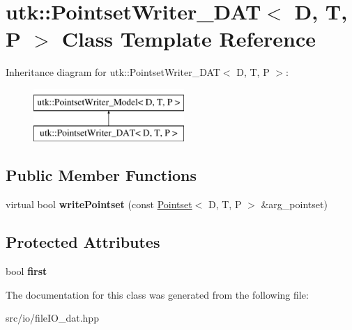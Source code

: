 \hypertarget{classutk_1_1PointsetWriter__DAT}{\section{utk\-:\-:Pointset\-Writer\-\_\-\-D\-A\-T$<$ D, T, P $>$ Class Template Reference}
\label{classutk_1_1PointsetWriter__DAT}
}
Inheritance diagram for utk\-:\-:Pointset\-Writer\-\_\-\-D\-A\-T$<$ D, T, P $>$\-:\begin{figure}[H]
\begin{center}
\leavevmode
\includegraphics[height=2.000000cm]{classutk_1_1PointsetWriter__DAT}
\end{center}
\end{figure}
\subsection*{Public Member Functions}
\begin{DoxyCompactItemize}
\item 
\hypertarget{classutk_1_1PointsetWriter__DAT_a62dbb084918b93bc4b2b1e40eac8c48b}{virtual bool {\bfseries write\-Pointset} (const \hyperlink{classutk_1_1Pointset}{Pointset}$<$ D, T, P $>$ \&arg\-\_\-pointset)}\label{classutk_1_1PointsetWriter__DAT_a62dbb084918b93bc4b2b1e40eac8c48b}

\end{DoxyCompactItemize}
\subsection*{Protected Attributes}
\begin{DoxyCompactItemize}
\item 
\hypertarget{classutk_1_1PointsetWriter__DAT_af3cf8e0a04d862a128cf5f5a008351d7}{bool {\bfseries first}}\label{classutk_1_1PointsetWriter__DAT_af3cf8e0a04d862a128cf5f5a008351d7}

\end{DoxyCompactItemize}


The documentation for this class was generated from the following file\-:\begin{DoxyCompactItemize}
\item 
src/io/file\-I\-O\-\_\-dat.\-hpp\end{DoxyCompactItemize}
